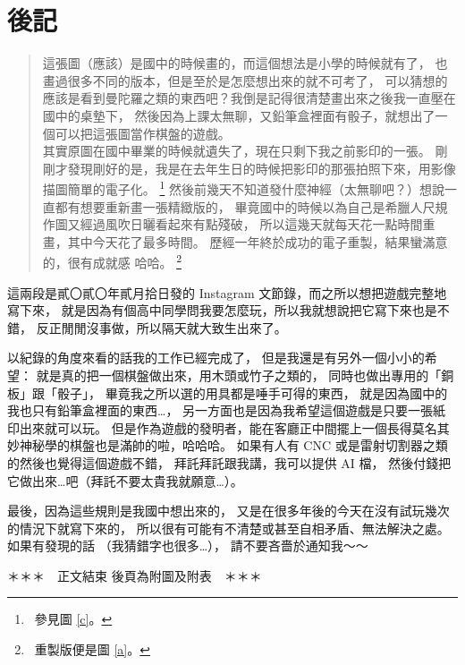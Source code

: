 \documentclass[11pt,a4paper]{article}
\begin{document}
\section{後記} \label{SECTION_THREE} %

\begin{quote}
	這張圖（應該）是國中的時候畫的，而這個想法是小學的時候就有了，
	也畫過很多不同的版本，但是至於是怎麼想出來的就不可考了，
	可以猜想的應該是看到曼陀羅之類的東西吧？我倒是記得很清楚畫出來之後我一直壓在國中的桌墊下，
	然後因為上課太無聊，又鉛筆盒裡面有骰子，就想出了一個可以把這張圖當作棋盤的遊戲。
	\\\indent
	其實原圖在國中畢業的時候就遺失了，現在只剩下我之前影印的一張。
	剛剛才發現剛好的是，我是在去年生日的時候把影印的那張拍照下來，用影像描圖簡單的電子化。
		\footnote{\ 參見圖 \ref{c}。}
	然後前幾天不知道發什麼神經（太無聊吧？）想說一直都有想要重新畫一張精緻版的，
	畢竟國中的時候以為自己是希臘人尺規作圖又經過風吹日曬看起來有點殘破，
	所以這幾天就每天花一點時間重畫，其中今天花了最多時間。
	歷經一年終於成功的電子重製，結果蠻滿意的，很有成就感 哈哈。
		\footnote{\ 重製版便是圖 \ref{a}。}
\end{quote}

\noindent
這兩段是貳〇貳〇年貳月拾日發的 Instagram 文節錄，而之所以想把遊戲完整地寫下來，
就是因為有個高中同學問我要怎麼玩，所以我就想說把它寫下來也是不錯，
反正閒閒沒事做，所以隔天就大致生出來了。

以紀錄的角度來看的話我的工作已經完成了，
但是我還是有另外一個小小的希望：
就是真的把一個棋盤做出來，用木頭或竹子之類的，
同時也做出專用的「銅板」跟「骰子」，
畢竟我之所以選的用具都是唾手可得的東西，
就是因為國中的我也只有鉛筆盒裡面的東西…，
另一方面也是因為我希望這個遊戲是只要一張紙印出來就可以玩。
但是作為遊戲的發明者，能在客廳正中間擺上一個長得莫名其妙神秘學的棋盤也是滿帥的啦，哈哈哈。
如果有人有 CNC 或是雷射切割器之類的然後也覺得這個遊戲不錯，
拜託拜託跟我講，我可以提供 AI 檔，
然後付錢把它做出來…吧（拜託不要太貴我就願意…）。

最後，因為這些規則是我國中想出來的，
又是在很多年後的今天在沒有試玩幾次的情況下就寫下來的，
所以很有可能有不清楚或甚至自相矛盾、無法解決之處。
如果有發現的話 （我猜錯字也很多…），
請不要吝嗇於通知我～～\\

\vfill\centerline{＊＊＊\ \ 正文結束 後頁為附圖及附表\ \ ＊＊＊}\vfill %
\pagebreak
\end{document}

